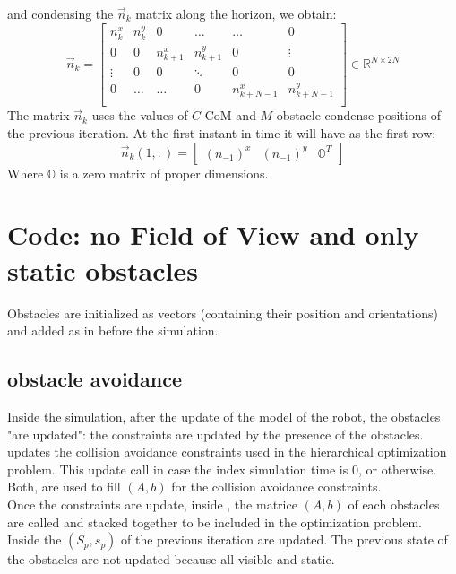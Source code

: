 and condensing the $\vec{n}_k$ matrix along the horizon, we obtain:
\begin{equation}
\vec{n}_k=\begin{bmatrix}
n^x_{k}&n^y_{k}&0&\dots&\dots&0\\
0&0&n^x_{k+1}&n^y_{k+1}&0&\vdots\\
\vdots&0&0&\ddots&0&0\\
0&\dots&\dots&0&n^x_{k+N-1}&n^y_{k+N-1}\\
\end{bmatrix}\in\mathbb{R}^{N\times 2N}
\end{equation}
The matrix $\vec{n}_k$ uses the values of  $C$ CoM and $M$ obstacle condense positions of the previous iteration. At the first instant in time it will have as the first row:
\begin{equation}
\vec{n}_k(1,:)=\begin{bmatrix}
(n_{-1})^x&(n_{-1})^y&\mathbb{O}^T
\end{bmatrix}
\end{equation}
Where $\mathbb{O}$ is a zero matrix of proper dimensions.


\section{Code: no Field of View and only static obstacles}

Obstacles are initialized as vectors (containing their position and orientations) and added as  in  before the simulation.

\subsection{obstacle avoidance}

Inside the simulation, after the update of the model of the robot, the obstacles "are updated":  the constraints are updated by the presence of the obstacles.  updates the collision avoidance constraints used in the hierarchical optimization problem. This update call  in case the index simulation time is $0$, or  otherwise. Both, are used to fill $(A,b)$ for the collision avoidance constraints.\\
Once the constraints are update, inside , the matrice $(A,b)$ of each obstacles are called and stacked together to be included in the optimization problem.\\
Inside  the $(S_p,s_p)$ of the previous iteration are updated. The previous state of the obstacles are not updated because all visible and static.

